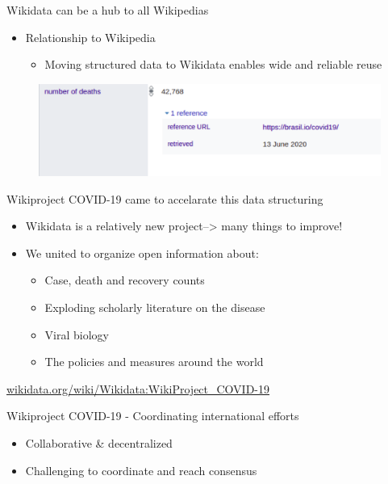 \documentclass{beamer}
\begin{document}
\begin{frame}{Wikidata can be a hub to all Wikipedias}

\begin{itemize}
    \item Relationship to Wikipedia
    
    \begin{itemize}
        \item Moving structured data to Wikidata enables wide and reliable reuse
    \end{itemize}
    
\end{itemize}

\begin{figure}
\includegraphics[scale=0.45]{fig/covid_19_brasil_on_wikidata.png}
\end{figure}
\end{frame}


\begin{frame}{Wikiproject COVID-19 came to accelarate this data structuring }

\begin{itemize}
    \item Wikidata is a relatively new project--> many things to improve!
    \item We united to organize open information about:
    
    \begin{itemize}
        \item Case, death and recovery counts
        \item Exploding scholarly literature on the disease
        \item Viral biology
        \item The policies and measures around the world
    \end{itemize}
\end{itemize}
\vskip 2cm

\url{wikidata.org/wiki/Wikidata:WikiProject_COVID-19}

\end{frame}


\begin{frame}{Wikiproject COVID-19 - Coordinating international efforts}
\begin{itemize}
    \item Collaborative & decentralized
    \item Challenging to coordinate and reach consensus
\end{itemize}
\end{frame}
\end{document}
